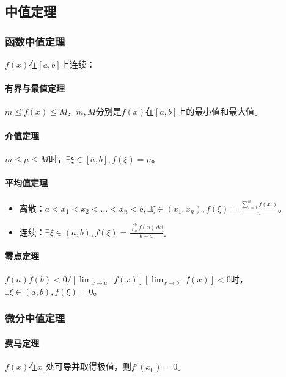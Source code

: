 \documentclass[
12pt, %
a4paper, 
oneside, %
headinclude,footinclude, %
]{scrartcl}
\begin{document}
\subsection[中值定理]{中值定理}
\subsubsection[函数中值定理]{函数中值定理}
$ f(x) $在$ [a, b] $上连续：
\paragraph{有界与最值定理}
$ m \leq f(x) \leq M $，$ m,M $分别是$ f(x) $在$ [a, b] $上的最小值和最大值。
\paragraph{介值定理}
$ m \leq \mu \leq M $时，$ \exists \xi \in [a, b], f(\xi) = \mu $。
\paragraph{平均值定理}
\begin{itemize}
\item 离散：$ a < x_1 < x_2 < \dots < x_n < b, \exists \xi \in (x_1, x_n), f(\xi) = \frac{\sum_{i = 1}^n f(x_i)}{n} $。
\item 连续：$ \exists \xi \in (a, b), f(\xi) = \frac{\int_{a}^{b} f(x)\,dx }{b - a} $。
\end{itemize}
\paragraph{零点定理}
$ f(a)f(b) < 0 / [\lim_{x \to a^+} f(x)][\lim_{x \to b^-} f(x)] < 0 $时，$ \exists \xi \in (a, b), f(\xi) = 0 $。
\subsubsection[微分中值定理]{微分中值定理}
\paragraph{费马定理}
$ f(x) $在$ x_0 $处可导并取得极值，则$ f'(x_0) = 0 $。
\end{document}
